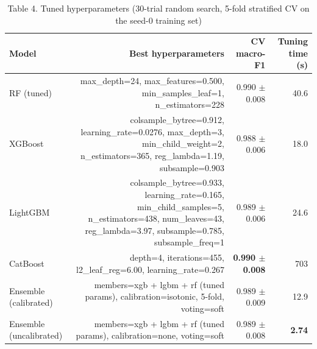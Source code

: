 \begin{table}[htbp]
\centering
\small
\caption{Table 4. Tuned hyperparameters (30-trial random search, 5-fold stratified CV on the seed-0 training set)}
\label{tab:table4_hyperparameters}
\begin{tabular}{lrrr}
\toprule
Model & Best hyperparameters & CV macro-F1 & Tuning time (s) \\
\midrule
RF (tuned) & max\_depth=24, max\_features=0.500, min\_samples\_leaf=1, n\_estimators=228 & 0.990 $\pm$ 0.008 & 40.6 \\
XGBoost & colsample\_bytree=0.912, learning\_rate=0.0276, max\_depth=3, min\_child\_weight=2, n\_estimators=365, reg\_lambda=1.19, subsample=0.903 & 0.988 $\pm$ 0.006 & 18.0 \\
LightGBM & colsample\_bytree=0.933, learning\_rate=0.165, min\_child\_samples=5, n\_estimators=438, num\_leaves=43, reg\_lambda=3.97, subsample=0.785, subsample\_freq=1 & 0.989 $\pm$ 0.006 & 24.6 \\
CatBoost & depth=4, iterations=455, l2\_leaf\_reg=6.00, learning\_rate=0.267 & \textbf{0.990 $\pm$ 0.008} & 703 \\
Ensemble (calibrated) & members=xgb + lgbm + rf (tuned params), calibration=isotonic, 5-fold, voting=soft & 0.989 $\pm$ 0.009 & 12.9 \\
Ensemble (uncalibrated) & members=xgb + lgbm + rf (tuned params), calibration=none, voting=soft & 0.989 $\pm$ 0.008 & \textbf{2.74} \\
\bottomrule
\end{tabular}
\end{table}
